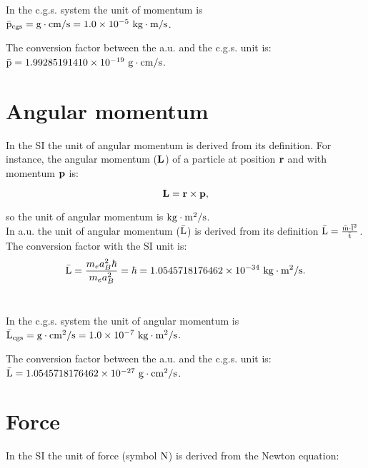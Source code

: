 \documentclass[12pt,a4paper,twoside]{report}
\def\hbarf{1.0545718176462\times 10^{-34}}
\def\ptop{1.0\times 10^{-5}}
\def\ltol{1.0\times 10^{-7}}
\def\barpcgs{1.99285191410\times 10^{-19}}
\def\baramcgs{1.0545718176462\times 10^{-27}}
\begin{document}
{\color{orange} In the c.g.s. system the unit of momentum is 
${\rm \bar p_{cgs}}={\rm g}\cdot {\rm cm}/{\rm s} = \ptop\ {\rm kg}\cdot {\rm m}/{\rm s}$.
\\
}

{\color{green} The conversion factor between the a.u. and the c.g.s. unit is:
${\rm \bar p}=\barpcgs\ {\rm g}\cdot {\rm cm}/{\rm s}$.
\\
}

\newpage
{\color{coral}\section{Angular momentum}}
\color{black}
In the SI the unit of angular momentum is derived from its
definition. For instance, the angular momentum (${\bf L}$) 
of a particle at position ${\bf r}$ and with momentum ${\bf p}$ is:

\begin{tcolorbox}
\begin{equation}
{\bf L}= {{\bf r} \times {\bf p}},
\end{equation} 
\end{tcolorbox}

so the unit of angular momentum is ${\rm kg}\cdot {\rm m}^2/{\rm s}$.
\\

{\color{web-blue} In a.u. the unit of angular momentum (${\rm \bar L}$) is derived 
from its definition
${\rm \bar L} = {{\rm \bar m} \cdot {\rm \bar l}^2 \over {\rm \bar t}}$. 
The conversion factor
with the SI unit is:
\begin{equation}
{\rm \bar L}={m_e a_B^2 \hbar \over m_e a_B^2}=\hbar=
\hbarf\ {\rm kg}\cdot {\rm m}^2/{\rm s}.
\end{equation}
\\
}

{\color{orange} In the c.g.s. system the unit of angular momentum is 
${\rm \bar L_{cgs}}={\rm g}\cdot {\rm cm}^2/{\rm s} = \ltol\ {\rm kg}\cdot {\rm m}^2/{\rm s}$.
\\
}

{\color{green} The conversion factor between the a.u. and the c.g.s. unit is:
${\rm \bar L}=\baramcgs\ {\rm g}\cdot {\rm cm}^2/{\rm s}$.
\\
}

\newpage
{\color{coral}\section{Force}}
\color{black}
In the SI the unit of force (symbol ${\rm N}$) is derived from  
the Newton equation:
\end{document}
